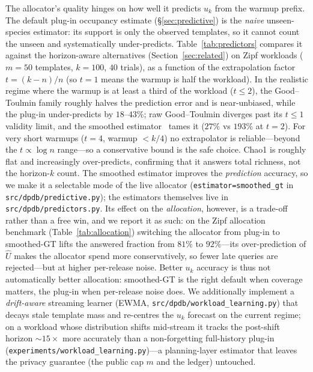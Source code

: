 \documentclass[sigconf,nonacm]{acmart}
\begin{document}
The allocator's quality hinges on how well it predicts $u_k$ from the warmup prefix. The default plug-in occupancy estimate (§\ref{sec:predictive}) is the \emph{naive} unseen-species estimator: its support is only the observed templates, so it cannot count the unseen and systematically under-predicts. Table~\ref{tab:predictors} compares it against the horizon-aware alternatives (Section~\ref{sec:related}) on Zipf workloads ($m=50$ templates, $k=100$, $40$ trials), as a function of the extrapolation factor $t=(k-n)/n$ (so $t=1$ means the warmup is half the workload). In the realistic regime where the warmup is at least a third of the workload ($t\le 2$), the Good--Toulmin family roughly halves the prediction error and is near-unbiased, while the plug-in under-predicts by $18$--$43\%$; raw Good--Toulmin diverges past its $t\le 1$ validity limit, and the smoothed estimator~\cite{orlitsky2016unseen} tames it ($27\%$ vs $193\%$ at $t=2$). For very short warmups ($t=4$, warmup $<k/4$) no extrapolator is reliable---beyond the $t\propto\log n$ range---so a conservative bound is the safe choice. Chao1 is roughly flat and increasingly over-predicts, confirming that it answers total richness, not the horizon-$k$ count. The smoothed estimator improves the \emph{prediction} accuracy, so we make it a selectable mode of the live allocator (\texttt{estimator=\textquotesingle smoothed\_gt\textquotesingle} in \texttt{src/dpdb/predictive.py}); the estimators themselves live in \texttt{src/dpdb/predictors.py}. Its effect on the \emph{allocation}, however, is a trade-off rather than a free win, and we report it as such: on the Zipf allocation benchmark (Table~\ref{tab:allocation}) switching the allocator from plug-in to smoothed-GT lifts the answered fraction from $81\%$ to $92\%$---its over-prediction of $\hat U$ makes the allocator spend more conservatively, so fewer late queries are rejected---but at higher per-release noise. Better $u_k$ accuracy is thus not automatically better allocation: smoothed-GT is the right default when coverage matters, the plug-in when per-release noise does. We additionally implement a \emph{drift-aware} streaming learner (EWMA, \texttt{src/dpdb/workload\_learning.py}) that decays stale template mass and re-centres the $u_k$ forecast on the current regime; on a workload whose distribution shifts mid-stream it tracks the post-shift horizon $\sim$$15\times$ more accurately than a non-forgetting full-history plug-in (\texttt{experiments/workload\_learning.py})---a planning-layer estimator that leaves the privacy guarantee (the public cap $m$ and the ledger) untouched.
\end{document}
